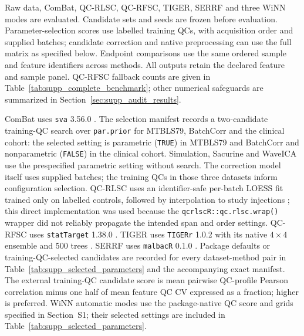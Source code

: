 \documentclass[namedate,webpdf,modern,large,nocrop]{oup-authoring-template}
\begin{document}
Raw data, ComBat, QC-RLSC, QC-RFSC, TIGER, SERRF and three WiNN modes are evaluated. Candidate sets and seeds are frozen before evaluation. Parameter-selection scores use labelled training QCs, with acquisition order and supplied batches; candidate correction and native preprocessing can use the full matrix as specified below. Endpoint comparisons use the same ordered sample and feature identifiers across methods. All outputs retain the declared feature and sample panel. QC-RFSC fallback counts are given in Table~\ref{tab:supp_complete_benchmark}; other numerical safeguards are summarized in Section~\ref{sec:supp_audit_results}.

ComBat uses \texttt{sva} 3.56.0 \citep{Johnson2007ComBat}. The selection manifest records a two-candidate training-QC search over \texttt{par.prior} for MTBLS79, BatchCorr and the clinical cohort: the selected setting is parametric (\texttt{TRUE}) in MTBLS79 and BatchCorr and nonparametric (\texttt{FALSE}) in the clinical cohort. Simulation, Sacurine and WaveICA use the prespecified parametric setting without search. The correction model itself uses supplied batches; the training QCs in those three datasets inform configuration selection. QC-RLSC uses an identifier-safe per-batch LOESS fit trained only on labelled controls, followed by interpolation to study injections \citep{Dunn2011,Cleveland1979LOESS}; this direct implementation was used because the \texttt{qcrlscR::qc.rlsc.wrap()} wrapper did not reliably propagate the intended span and order settings. QC-RFSC uses \texttt{statTarget} 1.38.0 \citep{Luan2018StatTarget}. TIGER uses \texttt{TIGERr} 1.0.2 with its native \(4\times4\) ensemble and 500 trees \citep{Han2022TIGER}. SERRF uses \texttt{malbacR} 0.1.0 \citep{Fan2019SERRF,Leach2023malbacR}. Package defaults or training-QC-selected candidates are recorded for every dataset-method pair in Table~\ref{tab:supp_selected_parameters} and the accompanying exact manifest. The external training-QC candidate score is mean pairwise QC-profile Pearson correlation minus one half of mean feature QC CV expressed as a fraction; higher is preferred. WiNN automatic modes use the package-native QC score and grids specified in Section~S1; their selected settings are included in Table~\ref{tab:supp_selected_parameters}.
\end{document}
